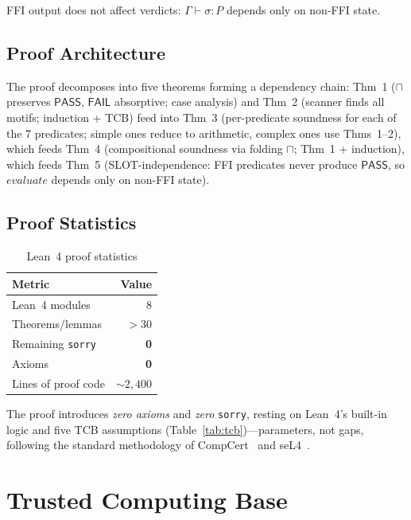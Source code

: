 \documentclass[runningheads]{llncs}
\newcommand{\PASS}{\ensuremath{\mathsf{PASS}}\xspace}
\newcommand{\FAIL}{\ensuremath{\mathsf{FAIL}}\xspace}
\newcommand{\tand}{\sqcap}
\newcommand{\seq}{\sigma}
\newcommand{\pred}{P}
\newcommand{\judg}[3]{#1 \vdash #2 : #3}
\begin{document}
\begin{corollary}\label{cor:slot}
FFI output does not affect verdicts: $\judg{\Gamma}{\seq}{\pred}$ depends only on non-FFI state.
\end{corollary}

\subsection{Proof Architecture}

The proof decomposes into five theorems forming a dependency chain: Thm~1 ($\tand$ preserves \PASS, $\FAIL$ absorptive; case analysis) and Thm~2 (scanner finds all motifs; induction + TCB) feed into Thm~3 (per-predicate soundness for each of the 7 predicates; simple ones reduce to arithmetic, complex ones use Thms~1--2), which feeds Thm~4 (compositional soundness via folding $\tand$; Thm~1 + induction), which feeds Thm~5 (SLOT-independence: FFI predicates never produce \PASS, so $\mathit{evaluate}$ depends only on non-FFI state).

\subsection{Proof Statistics}

\begin{table}[t]
\centering
\caption{Lean~4 proof statistics}
\label{tab:stats}
\begin{tabular}{lr}
\toprule
\textbf{Metric} & \textbf{Value} \\
\midrule
Lean~4 modules & 8 \\
Theorems/lemmas & $>$30 \\
Remaining \texttt{sorry} & \textbf{0} \\
Axioms & \textbf{0} \\
Lines of proof code & ${\sim}2{,}400$ \\
\bottomrule
\end{tabular}
\end{table}

The proof introduces \emph{zero axioms} and \emph{zero} \texttt{sorry}, resting on Lean~4's built-in logic and five TCB assumptions (Table~\ref{tab:tcb})---parameters, not gaps, following the standard methodology of CompCert~\cite{leroy2009compcert} and seL4~\cite{klein2014sel4}.

\section{Trusted Computing Base}\label{sec:tcb}
\end{document}
